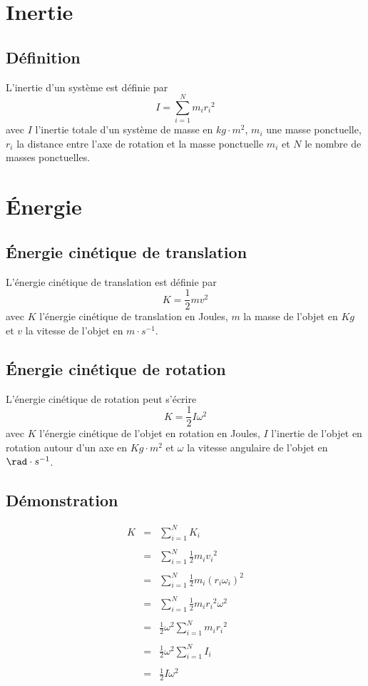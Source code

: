\documentclass[a4paper,10pt]{book} %
\begin{document}
\section{Inertie}
\subsection{Définition}
L'inertie d'un système est définie par $$I=\sum_{i=1}^{N}m_ir_i{}^2$$
avec $I$ l'inertie totale d'un système de masse en $kg\cdot m^2$, $m_i$ une masse ponctuelle, $r_i$ la distance entre l'axe de rotation et la masse ponctuelle $m_i$ et $N$ le nombre de masses ponctuelles.

\section{Énergie}
\subsection{Énergie cinétique de translation}
L'énergie cinétique de translation est définie par $$K=\frac{1}{2}mv^2$$
avec $K$ l'énergie cinétique de translation en Joules, $m$ la masse de l'objet en $Kg$ et $v$ la vitesse de l'objet en $m\cdot s^{-1}$.

\subsection{Énergie cinétique de rotation}
L'énergie cinétique de rotation peut s'écrire $$K=\frac{1}{2}I\omega^2$$
avec $K$ l'énergie cinétique de l'objet en rotation en Joules, $I$ l'inertie de l'objet en rotation autour d'un axe en $Kg\cdot m^2$ et $\omega$ la vitesse angulaire de l'objet en $\rad\cdot s^{-1}$.

\subsection{Démonstration}
$$\begin{array}{rcl} K&=&\displaystyle\sum_{i=1}^{N}K_i \\\\
&=&\displaystyle\sum_{i=1}^N\frac{1}{2}m_iv_i{}^2\\\\
&=&\displaystyle\sum_{i=1}^N\frac{1}{2}m_i(r_i\omega_i)^2 \\\\
&=&\displaystyle\sum_{i=1}^N\frac{1}{2} m_ir_i{}^2\omega^2 \\\\
&=&\frac{1}{2}\omega^2\displaystyle\sum_{i=1}^Nm_ir_i{}^2 \\\\
&=&\frac{1}{2}\omega^2\displaystyle\sum_{i=1}^NI_i \\\\
&=&\frac{1}{2}I\omega^2
\end{array}$$
\end{document}
